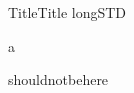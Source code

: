 
\begin{MXContent}{Title}{Title long}{STD}

  a
  \ifttm
  \begin{html}
  \end{html}
  \else
  shouldnotbehere
  \fi

\end{MXContent}
